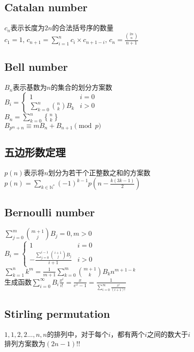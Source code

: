     \subsection*{Catalan number}
        $ c_n $表示长度为$ 2n $的合法括号序的数量
        \\$ c_1 = 1 $, $ c_{n+1} = \sum\limits_{i=1}^{n} c_i \times c_{n + 1 - i} $, $ c_n = \frac{\binom{2n}{n}}{n + 1} $
    \subsection*{Bell number}
        $ B_n $表示基数为$ n $的集合的划分方案数
        \\$ B_i = \begin{cases}
            1 & i = 0\\
            \sum\limits_{k = 0}^{n} \binom{n}{k} B_k & i > 0
        \end{cases} $
        \\$ B_n = \sum\limits_{k = 0}^{n} {n \brace k} $
        \\$ B_{p^m + n} \equiv m B_n + B_{n + 1} \pmod p $
    \subsection*{五边形数定理}
        $ p(n) $表示将$ n $划分为若干个正整数之和的方案数
        \\$ p(n) = \sum\limits_{k \in \mathbb{N}^\ast} (-1)^{k - 1} p(n - \frac{k(3k - 1)}{2}) $
    \subsection*{Bernoulli number}
        \noindent$ \sum\limits_{j = 0}^{m} \binom{m + 1}{j} B_j = 0, m > 0 $
        \\$ B_i = \begin{cases}
            1 & i = 0\\
            -\frac{\sum\limits_{j = 0}^{i - 1} \binom{i + 1}{j} B_j}{i + 1} & i > 0
        \end{cases} $
        \\$ \sum\limits_{k = 1}^{n} k ^ m = \frac{1}{m + 1} \sum\limits_{k = 0}^{m} \binom{m + 1}{k} B_k n ^ {m + 1 - k} $
        \\生成函数$ \sum\limits_{i = 0}^{\infty} B_i \frac{x^i}{i!} = \frac{x}{e^x - 1} = \frac{1}{\sum\limits_{i = 0}^{\infty} \frac{x^i}{(i + 1)!}} $
    \subsection*{Stirling permutation}
        $ 1, 1, 2, 2 \dots , n, n $的排列中，对于每个$ i $，都有两个$ i $之间的数大于$ i $
        \\排列方案数为$ (2n - 1)!! $
